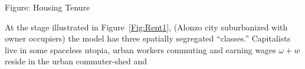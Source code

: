 Figure: Housing Tenure 



At the stage illustrated in Figure~\ref{Fig:Rent1},  (Alonzo city suburbanized with owner occupiers) the model has three spatially segregated ``classes.'' Capitalists live in some spaceless utopia, urban workers commuting and earning wages $\omega + w$ reside in the urban commuter-shed and  %